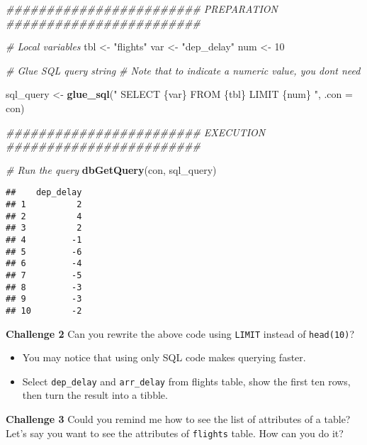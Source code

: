 \documentclass[
]{book}
\newenvironment{Shaded}{\begin{snugshade}}{\end{snugshade}}
\newcommand{\CommentTok}[1]{\textcolor[rgb]{0.56,0.35,0.01}{\textit{#1}}}
\newcommand{\DataTypeTok}[1]{\textcolor[rgb]{0.13,0.29,0.53}{#1}}
\newcommand{\DecValTok}[1]{\textcolor[rgb]{0.00,0.00,0.81}{#1}}
\newcommand{\KeywordTok}[1]{\textcolor[rgb]{0.13,0.29,0.53}{\textbf{#1}}}
\newcommand{\NormalTok}[1]{#1}
\newcommand{\StringTok}[1]{\textcolor[rgb]{0.31,0.60,0.02}{#1}}
\begin{document}
\begin{Shaded}
\begin{Highlighting}[]
\CommentTok{\#\#\#\#\#\#\#\#\#\#\#\#\#\#\#\#\#\#\#\#\#\#\#\# PREPARATION \#\#\#\#\#\#\#\#\#\#\#\#\#\#\#\#\#\#\#\#\#\#\#\#}

\CommentTok{\# Local variables }
\NormalTok{tbl \textless{}{-}}\StringTok{ "flights"}
\NormalTok{var \textless{}{-}}\StringTok{ "dep\_delay"}
\NormalTok{num \textless{}{-}}\StringTok{ }\DecValTok{10}

\CommentTok{\# Glue SQL query string }
\CommentTok{\# Note that to indicate a numeric value, you don\textquotesingle{}t need \textasciigrave{}\textasciigrave{}}

\NormalTok{sql\_query \textless{}{-}}\StringTok{ }\KeywordTok{glue\_sql}\NormalTok{(}\StringTok{"}
\StringTok{  SELECT \{\textasciigrave{}var\textasciigrave{}\}}
\StringTok{  FROM \{\textasciigrave{}tbl\textasciigrave{}\}}
\StringTok{  LIMIT \{num\} }
\StringTok{  "}\NormalTok{, }\DataTypeTok{.con =}\NormalTok{ con)}

\CommentTok{\#\#\#\#\#\#\#\#\#\#\#\#\#\#\#\#\#\#\#\#\#\#\#\# EXECUTION \#\#\#\#\#\#\#\#\#\#\#\#\#\#\#\#\#\#\#\#\#\#\#\#}

\CommentTok{\# Run the query }
\KeywordTok{dbGetQuery}\NormalTok{(con, sql\_query)}
\end{Highlighting}
\end{Shaded}

\begin{verbatim}
##    dep_delay
## 1          2
## 2          4
## 3          2
## 4         -1
## 5         -6
## 6         -4
## 7         -5
## 8         -3
## 9         -3
## 10        -2
\end{verbatim}

\textbf{Challenge 2}
Can you rewrite the above code using \texttt{LIMIT} instead of \texttt{head(10)}?

\begin{itemize}
\item
  You may notice that using only SQL code makes querying faster.
\item
  Select \texttt{dep\_delay} and \texttt{arr\_delay} from flights table, show the first ten rows, then turn the result into a tibble.
\end{itemize}

\textbf{Challenge 3}
Could you remind me how to see the list of attributes of a table? Let's say you want to see the attributes of \texttt{flights} table. How can you do it?
\end{document}
